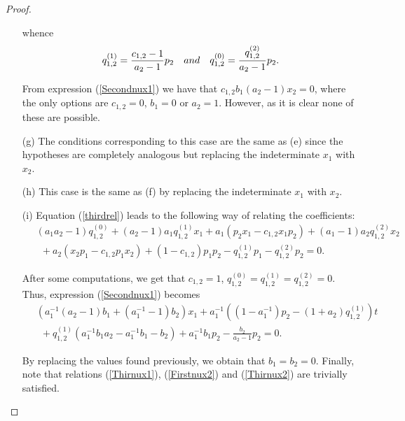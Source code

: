 \documentclass{amsart}
\theoremstyle{definition}
\theoremstyle{remark}
\numberwithin{equation}{section}
\begin{document}
\begin{proof}
\begin{enumerate}
whence 
     \begin{align*}
        q_{1,2}^{(1)}=\frac{c_{1,2}-1}{a_2-1}p_2 \quad {\rm and}\quad  q_{1,2}^{(0)}=\frac{q_{1,2}^{(2)}}{a_2-1}p_2.
    \end{align*}

From expression {\rm (}\ref{Secondnux1}{\rm )} we have that  $c_{1,2}b_1(a_2-1)x_2=0$, where the only options are $c_{1,2}=0$, $b_1=0$ or $a_2=1$. However, as it is clear none of these are possible.

    \item [\rm (g)] The conditions corresponding to this case are the same as \rm(e) since the hypotheses are completely analogous but replacing the indeterminate $x_1$ with $x_2$.
    
    \item [\rm (h)] This case is the same as \rm(f) by replacing the indeterminate $x_1$ with $x_2$.
    
    \item [\rm (i)] Equation (\ref{thirdrel}) leads to the following way of relating the coefficients:
    \begin{align*}
     &\ (a_1a_2-1)q_{1,2}^{(0)} + (a_2-1)a_1q_{1,2}^{(1)}x_1 + a_1(p_2x_1-c_{1,2}x_1p_2) + (a_1-1)a_2q_{1,2}^{(2)}x_2 \\
     &\ \ \ + a_2(x_2p_1-c_{1,2}p_1x_2) + (1-c_{1,2})p_1p_2-q_{1,2}^{(1)}p_1-q_{1,2}^{(2)}p_2=0.
    \end{align*}
    
After some computations, we get that $c_{1,2}=1$, $q_{1,2}^{(0)}=q_{1,2}^{(1)}=q_{1,2}^{(2)}=0$. Thus, expression {\rm (}\ref{Secondnux1}{\rm )} becomes
    \begin{align*}
     &\ (a_1^{-1}(a_2-1)b_1+(a_1^{-1}-1)b_2)x_1 +a_1^{-1}((1-a_1^{-1})p_2-(1+a_2)q_{1,2}^{(1)})t\\ 
    &\ \ \ + q_{1,2}^{(1)}(a_1^{-1}b_1a_2-a_1^{-1}b_1-b_2)+a_1^{-1}b_1p_2-\frac{b_2}{a_2-1}p_2 = 0.
    \end{align*}
    
By replacing the values found previously, we obtain that $b_1 = b_2 = 0$. Finally, note that relations {\rm (}\ref{Thirnux1}{\rm )}, {\rm (}\ref{Firstnux2}{\rm )} and  {\rm (}\ref{Thirnux2}{\rm )} are trivially satisfied.
\end{enumerate}


\end{proof}
\end{document}

